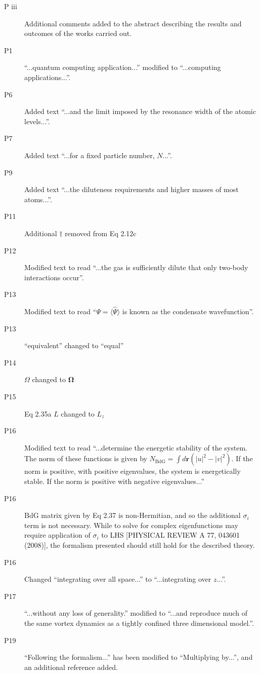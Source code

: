 \documentclass[paper=a4, fontsize=12pt]{scrartcl}
\begin{document}
\begin{description}
    \item [P iii] Additional comments added to the abstract describing the results and outcomes of the works carried out.
    \item [P1] ``...quantum computing application...'' modified to ``...computing applications...''.
    \item [P6] Added text ``...and the limit imposed by the resonance width of the atomic levels...''.
    \item [P7] Added text ``...for a fixed particle number, $N$...''.
    \item [P9] Added text ``...the diluteness requirements and higher masses of most atoms...''.
    \item [P11] Additional $\dagger$ removed from Eq 2.12c
    \item [P12] Modified text to read ``...the gas is sufficiently dilute that only two-body interactions occur''.
    \item [P13] Modified text to read ``$\Psi = \langle \hat{\Psi} \rangle$ is known as the condensate wavefunction''.
    \item [P13] ``equivalent'' changed to ``equal''
    \item [P14] $\Omega$ changed to $\mathbf{\Omega}$
    \item [P15] Eq 2.35a $L$ changed to $L_z$
    \item [P16] Modified text to read ``...determine the energetic stability of the system. The norm of these functions is given by $N_{\textrm{BdG}}=\int d\mathbf{r}(|u|^2 - |v|^2)$. If the norm is positive, with positive eigenvalues, the system is energetically stable. If the norm is positive with negative eigenvalues...''
    \item [P16] BdG matrix given by Eq 2.37 is non-Hermitian, and so the additional $\sigma_i$ term is not necessary. While to solve for complex eigenfunctions may require application of $\sigma_i$ to LHS [PHYSICAL REVIEW A 77, 043601 (2008)], the formalism presented should still hold for the described theory.
    \item [P16] Changed ``integrating over all space...'' to ``...integrating over $z$...''.
    \item [P17] ``...without any loss of generality.'' modified to ``...and reproduce much of the same vortex dynamics as a tightly confined three dimensional model.''.
    \item [P19] ``Following the formalism...'' has been modified to ``Multiplying by...'', and an additional reference added.

\end{description}
\end{document}
